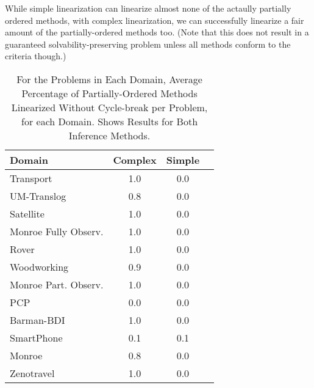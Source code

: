 \documentclass[letterpaper]{article} %
\begin{document}
While simple linearization can linearize almost none of the actaully partially ordered methods, with complex linearization, we can successfully linearize a fair amount of the partially-ordered methods too. (Note that this does not result in a guaranteed solvability-preserving problem unless all methods conform to the criteria though.)

\begin{table} 
	\caption{For the Problems in Each Domain, Average Percentage of Partially-Ordered Methods Linearized Without Cycle-break per Problem, for each Domain. Shows Results for Both Inference Methods.}\label{table:POMethodBreak} 
	\begin{tabular}{lccl} 
		\toprule 
		Domain & Complex & Simple &  \\ 
		\midrule
		Transport & 1.0 & 0.0  \\ 
		UM-Translog & 0.8 & 0.0  \\ 
		Satellite & 1.0 & 0.0  \\ 
		Monroe Fully Observ. & 1.0 & 0.0  \\ 
		Rover & 1.0 & 0.0  \\ 
		Woodworking & 0.9 & 0.0  \\ 
		Monroe Part. Observ. & 1.0 & 0.0  \\ 
		PCP & 0.0 & 0.0  \\ 
		Barman-BDI & 1.0 & 0.0  \\ 
		SmartPhone & 0.1 & 0.1  \\ 
		Monroe & 0.8 & 0.0  \\ 
		Zenotravel & 1.0 & 0.0  \\ 
		\bottomrule 
	\end{tabular} 
\end{table}  




\end{document}

